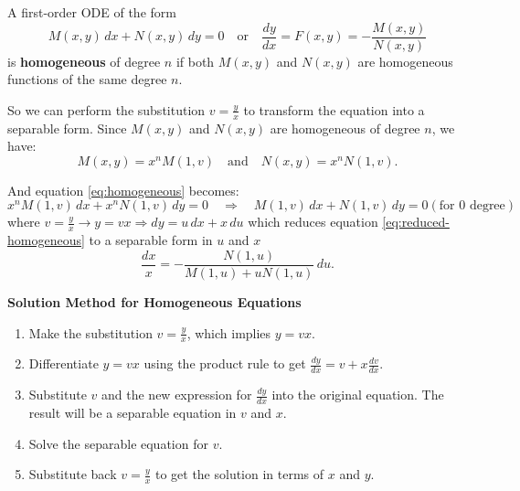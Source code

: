 \begin{definition}
A first-order ODE of the form 
\begin{equation}\label{eq:homogeneous}
M(x,y)\,dx + N(x,y)\,dy = 0 \quad \text{or} \quad \frac{dy}{dx} = F(x,y) = -\frac{M(x,y)}{N(x,y)}
\end{equation}
is \textbf{homogeneous} of degree \(n\) if both \(M(x,y)\) and \(N(x,y)\) are homogeneous functions 
of the same degree \(n\).
\end{definition}

So we can perform the substitution \(v  = \frac{y}{x}\) to transform the equation into a separable form.
Since \(M(x,y)\) and \(N(x,y)\) are homogeneous of degree \(n\), we have:
\[
M(x,y) = x^n M(1,v) \quad \text{and} \quad N(x,y) = x^n N(1,v).
\]

And equation \eqref{eq:homogeneous} becomes:
\begin{equation}\label{eq:reduced-homogeneous}
  x^n M(1,v)\,dx + x^n N(1,v)\,dy = 0 \quad \Rightarrow \quad M(1,v)\,dx + N(1,v)\,dy = 0 (\text{for 0 degree})
\end{equation}
where \(v = \frac{y}{x} \to y=vx \Rightarrow dy = u\,dx + x\,du\) which reduces equation \eqref{eq:reduced-homogeneous} to a separable form in \(u\) and \(x\)
\[
\frac{dx}{x} = -\frac{N(1,u)}{M(1,u) + uN(1,u)}\,du.
\]


\textbf{Solution Method for Homogeneous Equations}
\begin{enumerate}
    \item Make the substitution $v = \frac{y}{x}$, which implies $y=vx$.
    \item Differentiate $y=vx$ using the product rule to get $\frac{dy}{dx} = v + x\frac{dv}{dx}$.
    \item Substitute $v$ and the new expression for $\frac{dy}{dx}$ into the original equation. The result will be a separable equation in $v$ and $x$.
    \item Solve the separable equation for $v$.
    \item Substitute back $v=\frac{y}{x}$ to get the solution in terms of $x$ and $y$.
\end{enumerate}



